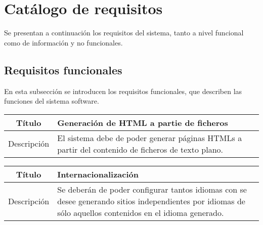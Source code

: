 
\section{Catálogo de requisitos}

Se presentan a continuación los requisitos del sistema, tanto a nivel funcional
como de información y no funcionales.

\subsection{Requisitos funcionales}

En esta subsección se introducen los requisitos funcionales, que describen las funciones
del sistema software.

\begin{center}

    \begin{tabularx}{\textwidth}{|c|X|}
        \hline
        Título & Generación de HTML a partie de ficheros\\

        \hline

        Descripción & El sistema debe de poder generar páginas HTMLs a partir
        del contenido de ficheros de texto plano.\\

        \hline
    \end{tabularx}
\end{center}

\begin{center}

    \begin{tabularx}{\textwidth}{|c|X|}
        \hline
        Título & Internacionalización\\

        \hline

        Descripción & Se deberán de poder configurar tantos idiomas con se desee
        generando sitios independientes por idiomas de sólo aquellos contenidos
        en el idioma generado.\\

        \hline
    \end{tabularx}
\end{center}

